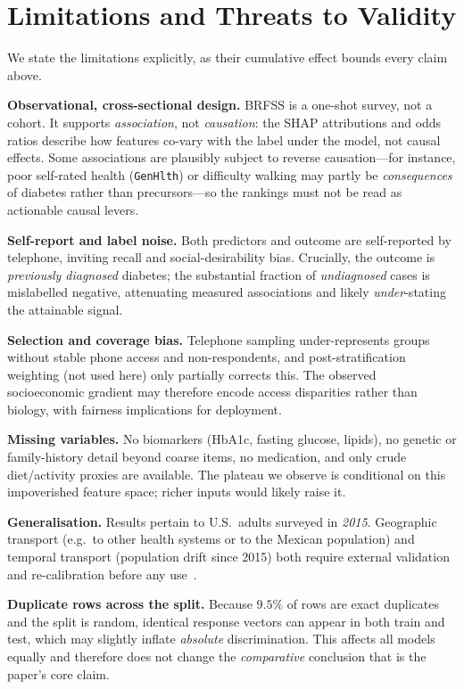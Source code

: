 \documentclass[conference]{IEEEtran}
\begin{document}
\section{Limitations and Threats to Validity}
We state the limitations explicitly, as their cumulative effect bounds every claim above.

\textbf{Observational, cross-sectional design.} BRFSS is a one-shot survey, not a cohort.
It supports \emph{association}, not \emph{causation}: the SHAP attributions and odds ratios
describe how features co-vary with the label under the model, not causal effects. Some
associations are plausibly subject to reverse causation---for instance, poor
self-rated health (\texttt{GenHlth}) or difficulty walking may partly be \emph{consequences}
of diabetes rather than precursors---so the rankings must not be read as actionable causal
levers.

\textbf{Self-report and label noise.} Both predictors and outcome are self-reported by
telephone, inviting recall and social-desirability bias. Crucially, the outcome is
\emph{previously diagnosed} diabetes; the substantial fraction of \emph{undiagnosed} cases
is mislabelled negative, attenuating measured associations and likely \emph{under}-stating
the attainable signal.

\textbf{Selection and coverage bias.} Telephone sampling under-represents groups without
stable phone access and non-respondents, and post-stratification weighting (not used here)
only partially corrects this. The observed socioeconomic gradient may therefore encode
access disparities rather than biology, with fairness implications for deployment.

\textbf{Missing variables.} No biomarkers (HbA1c, fasting glucose, lipids), no genetic or
family-history detail beyond coarse items, no medication, and only crude diet/activity
proxies are available. The plateau we observe is conditional on this impoverished feature
space; richer inputs would likely raise it.

\textbf{Generalisation.} Results pertain to U.S.\ adults surveyed in \emph{2015}.
Geographic transport (e.g.\ to other health systems or to the Mexican population) and
temporal transport (population drift since 2015) both require external validation and
re-calibration before any use~\cite{vancalster2019calibration,collins2024tripod}.

\textbf{Duplicate rows across the split.} Because $9.5\%$ of rows are exact duplicates and
the split is random, identical response vectors can appear in both train and test, which
may slightly inflate \emph{absolute} discrimination. This affects all models equally and
therefore does not change the \emph{comparative} conclusion that is the paper's core claim.
\end{document}
